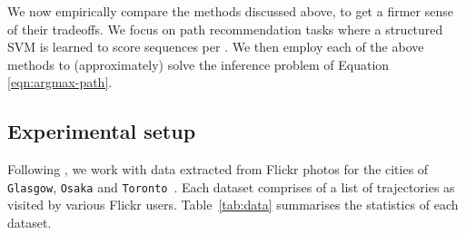 
We now empirically compare the methods discussed above,
to get a firmer sense of their tradeoffs.
We focus on path recommendation tasks where a structured SVM is learned to score sequences per \citet{Chen:2017}.
We then employ each of the above methods to (approximately) solve the inference problem of Equation \ref{eqn:argmax-path}.

%
\subsection{Experimental setup}

Following \citet{cikm16paper,Chen:2017},
we work with
data
extracted from Flickr photos for the cities of {\tt Glasgow}, {\tt Osaka} and
{\tt Toronto}~\cite{ijcai15,cikm16paper}.
Each dataset comprises of a
list of trajectories as visited by various Flickr users. %
Table~\ref{tab:data} summarises the statistics of each dataset.


